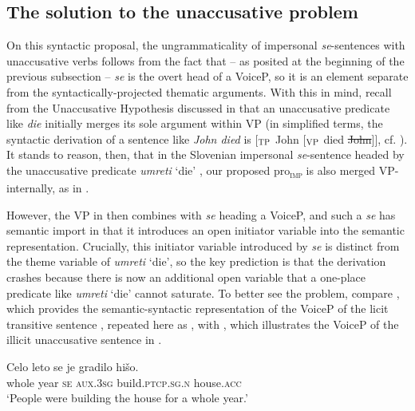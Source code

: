 \documentclass[output=paper,
modfonts,nonflat,
newtxmath
]{langsci/langscibook}
\begin{document}
\subsection{The solution to the unaccusative problem}

On this syntactic proposal, the ungrammaticality of impersonal \textit{se}-sentences with unaccusative verbs follows from the fact that – as posited at the beginning of the previous subsection – \textit{se} is the overt head of a VoiceP, so it is an element separate from the syntactically-projected thematic arguments. With this in mind, recall from the Unaccusative Hypothesis discussed in  that an unaccusative predicate like \textit{die} initially merges its sole argument within VP (in simplified terms, the syntactic derivation of a sentence like \textit{John died} is [$_{\textsc{TP}}$ John [$_{\textsc{VP}}$ died \st{John}]], cf. ). It stands to reason, then, that in the Slovenian impersonal \textit{se}-sentence headed by the unaccusative predicate \textit{umreti} `die' , our proposed pro\textsubscript{\textsc{imp}} is also merged VP-internally, as in .
\begin{exe}
\ex 
\begin{xlist}
 \label{VcUm2}
\end{xlist}
\end{exe}


\noindent However, the VP in  then combines with \textit{se} heading a VoiceP, and such a \textit{se} has semantic import in that it introduces an open initiator variable into the semantic representation. Crucially, this initiator variable introduced by \textit{se} is distinct from the theme variable of \textit{umreti} `die', so the key prediction is that the derivation crashes because there is now an additional open variable that a one-place predicate like \textit{umreti} `die' cannot saturate. To better see the problem, compare , which provides the semantic-syntactic representation of the VoiceP of the licit transitive sentence , repeated here as , with , which illustrates the VoiceP of the illicit unaccusative sentence in .
\begin{exe}
\ex \label{repeated} \gll Celo leto se je gradilo hišo.\\  
   whole year \textsc{se} \textsc{aux}.\textsc{3sg} build.\textsc{ptcp.sg.n} house.\textsc{acc}\\ 
\trans `People were building the house for a whole year.'
\end{exe}
\end{document}
